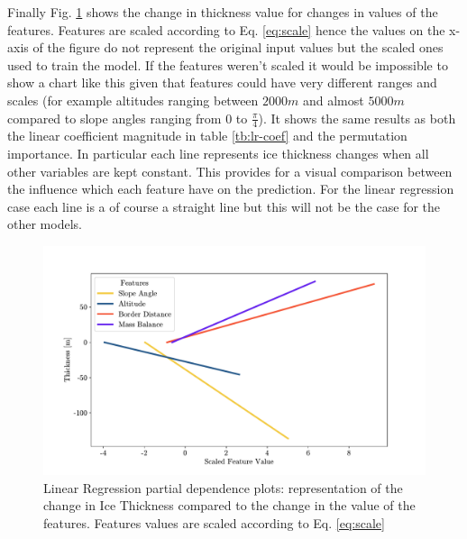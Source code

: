 Finally Fig. \ref{fig:lr-pdp} shows the change in thickness value for changes in values of the features. Features are scaled according to Eq. \ref{eq:scale} hence the values on the x-axis of the figure do not represent the original input values but the scaled ones used to train the model. If the features weren't scaled it would be impossible to show a chart like this given that features could have very different ranges and scales (for example altitudes ranging between  $2000m$ and almost $5000m$ compared to slope angles ranging from $0$ to $\frac{\pi}{4}$). It shows the same results as both the linear coefficient magnitude in table \ref{tb:lr-coef} and the permutation importance. In particular each line represents ice thickness changes when all other variables are kept constant. This provides for a visual comparison between the influence which each feature have on the prediction. For the linear regression case each line is a of course a straight line but this will not be the case for the other models.

\begin{figure}[!tp]
	\centering		  
	\includegraphics[width=1.\textwidth]{figures/LR_pdp.pdf}
	\caption{Linear Regression partial dependence plots: representation of the change in Ice Thickness compared to the change in the value of the features. Features values are scaled according to Eq. \ref{eq:scale}}
	\label{fig:lr-pdp}
\end{figure}

